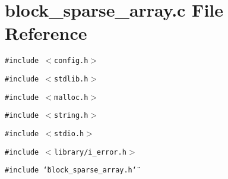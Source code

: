 \section{block\_\-sparse\_\-array.c File Reference}
\label{block__sparse__array_8c}
{\tt \#include $<$config.h$>$}\par
{\tt \#include $<$stdlib.h$>$}\par
{\tt \#include $<$malloc.h$>$}\par
{\tt \#include $<$string.h$>$}\par
{\tt \#include $<$stdio.h$>$}\par
{\tt \#include $<$library/i\_\-error.h$>$}\par
{\tt \#include \char`\"{}block\_\-sparse\_\-array.h\char`\"{}}\par
